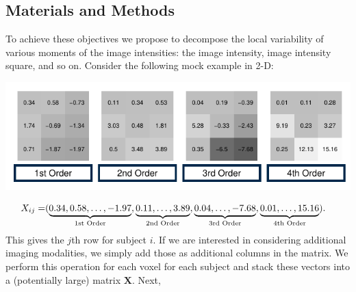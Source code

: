 \documentclass[a0,landscape]{a0poster}
\begin{document}
\begin{multicols}{3}
\large{\section*{\color{uwred}Materials and Methods}}
\noindent To achieve these objectives we propose to decompose the local variability of various moments of the image intensities: the image intensity, image  intensity square, and so on. Consider the following mock example in 2-D:
\begin{center}\vspace{.25cm}
\includegraphics[width=1\linewidth]{ln_example_higherorder_poset.pdf}
\end{center}\vspace{.25cm}
\normalsize{
\begin{align*}
\begin{aligned}
X_{ij} = &(\underbrace{0.34, 0.58, \ldots, -1.97}_{\text{\normalfont 1st Order}}, \underbrace{0.11, \ldots, 3.89}_{\text{\normalfont 2nd Order}}, \underbrace{0.04, \ldots, -7.68}_{\text{\normalfont 3rd Order}}, \underbrace{0.01, \ldots, 15.16}_{\text{\normalfont 4th Order}}).
\end{aligned}
\end{align*}}
\large
\noindent This gives the $j$th row for subject $i$. If we are interested in considering additional imaging modalities, we simply add those as additional columns in the matrix. We perform this operation for each voxel for each subject and stack these vectors into a (potentially large) matrix $\mathbf{X}$. Next,


\end{multicols}
\end{document}
